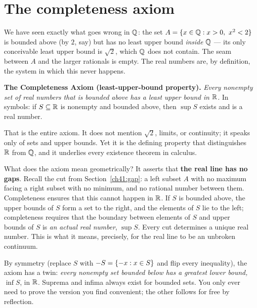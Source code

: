 \section{The completeness axiom}
\label{ch41:axiom}

We have seen exactly what goes wrong in $\mathbb{Q}$: the set $A = \{x\in\mathbb{Q} : x>0,\ x^2<2\}$ is
bounded above (by $2$, say) but has no least upper bound \emph{inside $\mathbb{Q}$} --- its only
conceivable least upper bound is $\sqrt 2$, which $\mathbb{Q}$ does not contain. The seam between
$A$ and the larger rationals is empty. The real numbers are, by definition, the system in
which this never happens.

\begin{focusbox}
\textbf{The Completeness Axiom (least-upper-bound property).}
\emph{Every nonempty set of real numbers that is bounded above has a least upper bound
in $\mathbb{R}$.} In symbols: if $S\subseteq\mathbb{R}$ is nonempty and bounded above, then $\sup S$
exists and is a real number.
\end{focusbox}

That is the entire axiom. It does not mention $\sqrt 2$, limits, or
continuity; it speaks only of sets and upper bounds. Yet it is the defining property that
distinguishes $\mathbb{R}$ from $\mathbb{Q}$, and it underlies every existence theorem in
calculus.

\begin{happeningbox}
What does the axiom mean geometrically? It asserts that \textbf{the real line has no gaps}.
Recall the cut from Section~\ref{ch41:gap}: a left subset $A$ with no maximum facing a right subset
with no minimum, and no rational number between them. Completeness ensures that this cannot happen
in $\mathbb{R}$. If $S$ is bounded above, the upper bounds of $S$ form a set to the right, and the elements
of $S$ lie to the left; completeness requires that the boundary between elements of $S$ and upper
bounds of $S$ is \emph{an actual real number}, $\sup S$. Every cut determines a unique real number.
This is what it means, precisely, for the real line to be an unbroken continuum.
\end{happeningbox}

\begin{remark}
By symmetry (replace $S$ with $-S = \{-x : x\in S\}$ and flip every inequality), the
axiom has a twin: \emph{every nonempty set bounded below has a greatest lower bound,}
$\inf S$, in $\mathbb{R}$. Suprema and infima always exist for bounded sets. You only ever need to
prove the version you find convenient; the other follows for free by reflection.
\end{remark}

